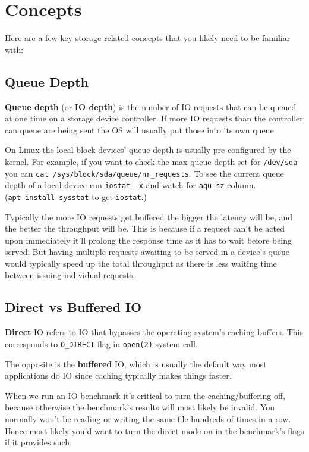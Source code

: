 \documentclass[
]{report}
\begin{document}
\section{Concepts}\label{concepts}

Here are a few key storage-related concepts that you likely need to be
familiar with:

\subsection{Queue Depth}\label{queue-depth}

\textbf{Queue depth} (or \textbf{IO depth}) is the number of IO requests
that can be queued at one time on a storage device controller. If more
IO requests than the controller can queue are being sent the OS will
usually put those into its own queue.

On Linux the local block devices' queue depth is usually pre-configured
by the kernel. For example, if you want to check the max queue depth set
for \texttt{/dev/sda} you can
\texttt{cat\ /sys/block/sda/queue/nr\_requests}. To see the current
queue depth of a local device run \texttt{iostat\ -x} and watch for
\texttt{aqu-sz} column. (\texttt{apt\ install\ sysstat} to get
\texttt{iostat}.)

Typically the more IO requests get buffered the bigger the latency will
be, and the better the throughput will be. This is because if a request
can't be acted upon immediately it'll prolong the response time as it
has to wait before being served. But having multiple requests awaiting
to be served in a device's queue would typically speed up the total
throughput as there is less waiting time between issuing individual
requests.

\subsection{Direct vs Buffered IO}\label{direct-vs-buffered-io}

\textbf{Direct} IO refers to IO that bypasses the operating system's
caching buffers. This corresponds to \texttt{O\_DIRECT} flag in
\texttt{open(2)} system call.

The opposite is the \textbf{buffered} IO, which is usually the default
way most applications do IO since caching typically makes things faster.

When we run an IO benchmark it's critical to turn the caching/buffering
off, because otherwise the benchmark's results will most likely be
invalid. You normally won't be reading or writing the same file hundreds
of times in a row. Hence most likely you'd want to turn the direct mode
on in the benchmark's flags if it provides such.
\end{document}
